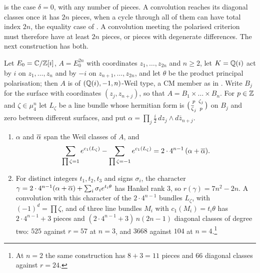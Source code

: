  is the case $\delta=0$, with any number of pieces. A
convolution reaches its diagonal classes once it has $2n$ pieces, when a
cycle through all of them can have total index $2n$, the equality case of
. A convolution meeting the polarised criterion must
therefore have at least $2n$ pieces, or pieces with degenerate differences.
The next construction has both.

\begin{proposition}
\label{prop:weilpieces}
Let $E_{0}=\mathbb{C}/\mathbb{Z}[i]$, $A=E_{0}^{2n}$ with coordinates $z_{1},\dots,z_{2n}$
and $n\ge2$, let $K=\mathbb{Q}(i)$ act by $i$ on $z_{1},\dots,z_{n}$ and by $-i$
on $z_{n+1},\dots,z_{2n}$, and let $\theta$ be the product principal
polarisation; then $A$ is of $(\mathbb{Q}(i),-1,n)$-Weil type, a CM member as in
. Write $B_{j}$ for the surface with coordinates
$(z_{j},z_{n+j})$, so that $A=B_{1}\times\dots\times B_{n}$. For $p\in\mathbb{Z}$
and $\zeta\in\mu_{4}^{n}$ let $L_{\zeta}$ be a line bundle whose hermitian
form is $\bigl(\begin{smallmatrix}p&\zeta_{j}\\ \overline{\zeta}_{j}&p
\end{smallmatrix}\bigr)$ on $B_{j}$ and zero between different surfaces, and
put $\alpha=\prod_{j}\tfrac{i}{2}\,dz_{j}\wedge d\bar z_{n+j}$.
\begin{enumerate}[label=\textup{(\roman*)},leftmargin=2.6em,itemsep=2pt]
\item $\alpha$ and $\overline{\alpha}$ span the Weil classes of $A$, and
  \[
    \sum_{\prod\zeta=1}e^{c_{1}(L_{\zeta})}
    -\sum_{\prod\zeta=-1}e^{c_{1}(L_{\zeta})}
    =2\cdot4^{n-1}\,(\alpha+\overline{\alpha}).
  \]
\item For distinct integers $t_{1},t_{2},t_{3}$ and signs $\sigma_{i}$, the
  character
  $\gamma=2\cdot4^{n-1}(\alpha+\overline{\alpha})+\sum_{i}\sigma_{i}e^{t_{i}\theta}$
  has Hankel rank $3$, so $r(\gamma)=7n^{2}-2n$. A convolution with this
  character of the $2\cdot4^{n-1}$ bundles $L_{\zeta}$, with
  $(-1)^{d}=\prod\zeta$, and of three line bundles $M_{i}$ with
  $c_{1}(M_{i})=t_{i}\theta$ has $2\cdot4^{n-1}+3$ pieces and
  $(2\cdot4^{n-1}+3)\,n(2n-1)$ diagonal classes of degree two: $525$
  against $r=57$ at $n=3$, and $3668$ against $104$ at
  $n=4$.\footnote{At $n=2$ the same construction has $8+3=11$ pieces and
  $66$ diagonal classes against $r=24$.}
\end{enumerate}
\end{proposition}

